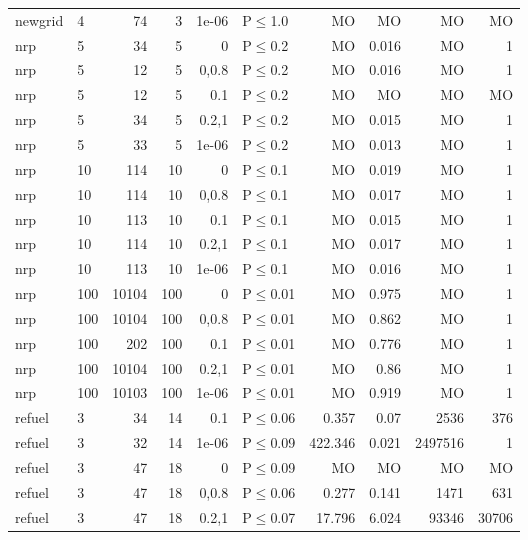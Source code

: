 \begin{longtable}{llrrrlrrrr}
 newgrid       & 4        &     	74 &   3 & 1e-06 & P$\leq$1.0   & MO       & MO       & MO      & MO     \\
 nrp           & 5        &     	34 &   5 & 0     & P$\leq$0.2   & MO       & 0.016    & MO      & 1      \\
 nrp           & 5        &     	12 &   5 & 0,0.8 & P$\leq$0.2   & MO       & 0.016    & MO      & 1      \\
 nrp           & 5        &     	12 &   5 & 0.1   & P$\leq$0.2   & MO       & MO       & MO      & MO     \\
 nrp           & 5        &     	34 &   5 & 0.2,1 & P$\leq$0.2   & MO       & 0.015    & MO      & 1      \\
 nrp           & 5        &     	33 &   5 & 1e-06 & P$\leq$0.2   & MO       & 0.013    & MO      & 1      \\
 nrp           & 10       &    	114 &  10 & 0     & P$\leq$0.1   & MO       & 0.019    & MO      & 1      \\
 nrp           & 10       &    	114 &  10 & 0,0.8 & P$\leq$0.1   & MO       & 0.017    & MO      & 1      \\
 nrp           & 10       &    	113 &  10 & 0.1   & P$\leq$0.1   & MO       & 0.015    & MO      & 1      \\
 nrp           & 10       &    	114 &  10 & 0.2,1 & P$\leq$0.1   & MO       & 0.017    & MO      & 1      \\
 nrp           & 10       &    	113 &  10 & 1e-06 & P$\leq$0.1   & MO       & 0.016    & MO      & 1      \\
 nrp           & 100      &  	10104 & 100 & 0     & P$\leq$0.01  & MO       & 0.975    & MO      & 1      \\
 nrp           & 100      &  	10104 & 100 & 0,0.8 & P$\leq$0.01  & MO       & 0.862    & MO      & 1      \\
 nrp           & 100      &    	202 & 100 & 0.1   & P$\leq$0.01  & MO       & 0.776    & MO      & 1      \\
 nrp           & 100      &  	10104 & 100 & 0.2,1 & P$\leq$0.01  & MO       & 0.86     & MO      & 1      \\
 nrp           & 100      &  	10103 & 100 & 1e-06 & P$\leq$0.01  & MO       & 0.919    & MO      & 1      \\
 refuel        & 3        &     	34 &  14 & 0.1   & P$\leq$0.06  & 0.357    & 0.07     & 2536    & 376    \\
 refuel        & 3        &     	32 &  14 & 1e-06 & P$\leq$0.09  & 422.346  & 0.021    & 2497516 & 1      \\
 refuel        & 3        &     	47 &  18 & 0     & P$\leq$0.09  & MO       & MO       & MO      & MO     \\
 refuel        & 3        &     	47 &  18 & 0,0.8 & P$\leq$0.06  & 0.277    & 0.141    & 1471    & 631    \\
 refuel        & 3        &     	47 &  18 & 0.2,1 & P$\leq$0.07  & 17.796   & 6.024    & 93346   & 30706  \\
\bottomrule
\end{longtable}
